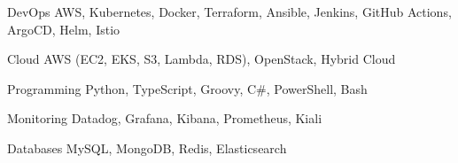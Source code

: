 
\begin{cvskills}

  \cvskill
    {DevOps} %
    {AWS, Kubernetes, Docker, Terraform, Ansible, Jenkins, GitHub Actions, ArgoCD, Helm, Istio} %

  \cvskill
    {Cloud} %
    {AWS (EC2, EKS, S3, Lambda, RDS), OpenStack, Hybrid Cloud} %

  \cvskill
    {Programming} %
    {Python, TypeScript, Groovy, C\#, PowerShell, Bash} %

  \cvskill
    {Monitoring} %
    {Datadog, Grafana, Kibana, Prometheus, Kiali} %

  \cvskill
    {Databases} %
    {MySQL, MongoDB, Redis, Elasticsearch} %

\end{cvskills}
